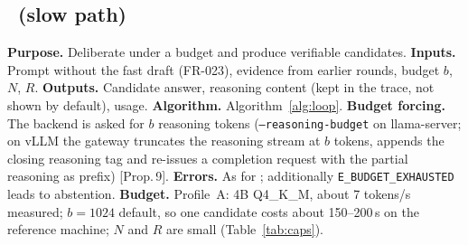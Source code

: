 \documentclass[11pt,a4paper]{article}
\begin{document}
\subsection{\Stwo\ (slow path)}
\textbf{Purpose.} Deliberate under a budget and produce verifiable candidates. \textbf{Inputs.} Prompt without the fast draft (FR-023), evidence from earlier rounds, budget $b$, $N$, $R$. \textbf{Outputs.} Candidate answer, reasoning content (kept in the trace, not shown by default), usage. \textbf{Algorithm.} Algorithm~\ref{alg:loop}. \textbf{Budget forcing.} The backend is asked for $b$ reasoning tokens (\texttt{--reasoning-budget} on llama-server; on vLLM the gateway truncates the reasoning stream at $b$ tokens, appends the closing reasoning tag and re-issues a completion request with the partial reasoning as prefix) [Prop.\,9]. \textbf{Errors.} As for \Sone; additionally \texttt{E\_BUDGET\_EXHAUSTED} leads to abstention. \textbf{Budget.} Profile~A: 4B Q4\_K\_M, about 7 tokens/s measured; $b=1024$ default, so one candidate costs about 150--200\,s on the reference machine; $N$ and $R$ are small (Table~\ref{tab:caps}).
\end{document}
